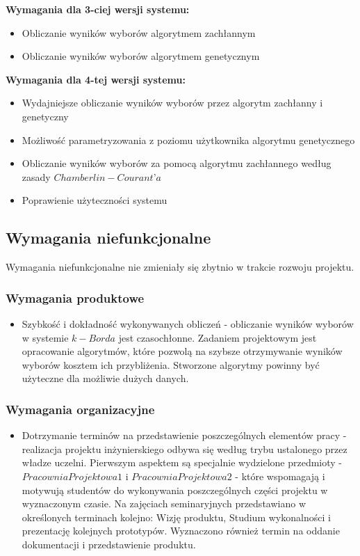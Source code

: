 \documentclass[pdflatex,11pt]{../aghdoc_version2}
\begin{document}
\textbf{Wymagania dla 3-ciej wersji systemu:}
\begin{itemize}
\item Obliczanie wyników wyborów algorytmem zachłannym
\item Obliczanie wyników wyborów algorytmem genetycznym
\end{itemize}
\vspace{\baselineskip}
\textbf{Wymagania dla 4-tej wersji systemu:}
\begin{itemize}
\item Wydajniejsze obliczanie wyników wyborów przez algorytm zachłanny i genetyczny
\item Możliwość parametryzowania z poziomu użytkownika algorytmu genetycznego
\item Obliczanie wyników wyborów za pomocą algorytmu zachłannego
według zasady $Chamberlin-Courant’a$
\item Poprawienie użyteczności systemu
\end{itemize}

\subsection{Wymagania niefunkcjonalne}
Wymagania niefunkcjonalne nie zmieniały się zbytnio w trakcie rozwoju projektu.

\subsubsection{Wymagania produktowe}
\begin{itemize}
\item Szybkość i dokładność wykonywanych obliczeń - obliczanie wyników wyborów w
systemie $k-Borda$ jest czasochłonne. Zadaniem projektowym jest opracowanie
algorytmów, które pozwolą na szybsze otrzymywanie wyników wyborów kosztem ich
przybliżenia. Stworzone algorytmy powinny być użyteczne dla możliwie dużych
danych.
\end{itemize}

\subsubsection{Wymagania organizacyjne}
\begin{itemize}
\item Dotrzymanie terminów na przedstawienie poszczególnych elementów pracy -
realizacja projektu inżynierskiego odbywa się według trybu ustalonego przez władze
uczelni. Pierwszym aspektem są specjalnie wydzielone przedmioty - $Pracownia
Projektowa 1$ i $Pracownia Projektowa 2$ - które wspomagają i motywują studentów
do wykonywania poszczególnych części projektu w wyznaczonym czasie. Na
zajęciach seminaryjnych przedstawiano w określonych terminach kolejno: Wizję
produktu, Studium wykonalności i prezentację kolejnych prototypów. Wyznaczono
również termin na oddanie dokumentacji i przedstawienie produktu.
\end{itemize}
\end{document}
